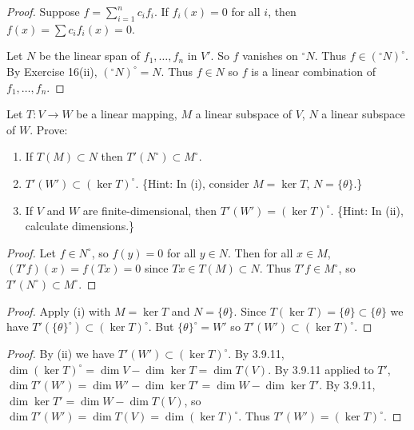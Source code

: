 \begin{proof}
    Suppose $f = \sum_{i=1}^n c_i f_i$.
    If $f_i(x) = 0$ for all $i$, then $f(x) = \sum c_i f_i(x) = 0$.

    Let $N$ be the linear span of $f_1, \ldots, f_n$ in $V'$.
    So $f$ vanishes on ${}^\circ N$.
    Thus $f \in ({}^\circ N)^\circ$.
    By Exercise 16(ii), $({}^\circ N)^\circ = N$.
    Thus $f \in N$ so $f$ is a linear combination of $f_1, \ldots, f_n$.
\end{proof}

\begin{tcolorbox}[title=Exercise 18, breakable]
    Let $T : V \to W$ be a linear mapping, $M$ a linear subspace of $V$, $N$ a 
    linear subspace of $W$. Prove:
    \begin{enumerate}
        \item[(i)] If $T(M) \subset N$ then $T'(N^\circ) \subset M^\circ$.
        \item[(ii)] $T'(W') \subset (\ker T)^\circ$. \{Hint: In (i), consider $M = \ker T$, $N = \{\theta\}$.\}
        \item[(iii)] If $V$ and $W$ are finite-dimensional, then $T'(W') = (\ker T)^\circ$. \{Hint: 
        In (ii), calculate dimensions.\}
    \end{enumerate}
\end{tcolorbox}

\begin{proof}
    Let $f \in N^\circ$, so $f(y) = 0$ for all $y \in N$.
    Then for all $x \in M$, $(T'f)(x) = f(Tx) = 0$ since $Tx \in T(M) \subset N$.
    Thus $T'f \in M^\circ$, so $T'(N^\circ) \subset M^\circ$.
\end{proof}

\begin{proof}
    Apply (i) with $M = \ker T$ and $N = \{\theta\}$.
    Since $T(\ker T) = \{\theta\} \subset \{\theta\}$ we have $T'(\{\theta\}^\circ) \subset (\ker T)^\circ$.
    But $\{\theta\}^\circ = W'$ so $T'(W') \subset (\ker T)^\circ$.
\end{proof}

\begin{proof}
    By (ii) we have $T'(W') \subset (\ker T)^\circ$.
    By 3.9.11, $\dim(\ker T)^\circ = \dim V - \dim \ker T = \dim T(V)$.
    By 3.9.11 applied to $T'$, $\dim T'(W') = \dim W' - \dim \ker T' = \dim W - \dim \ker T'$.
    By 3.9.11, $\dim \ker T' = \dim W - \dim T(V)$, so $\dim T'(W') = \dim T(V) = \dim (\ker T)^\circ$.
    Thus $T'(W') = (\ker T)^\circ$.
\end{proof}


